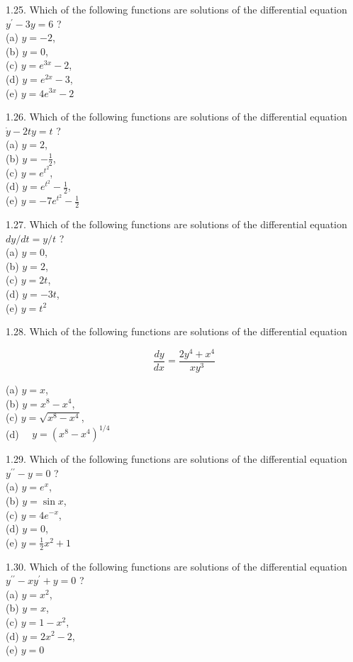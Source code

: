 \documentclass[10pt]{article}
\begin{document}
1.25. Which of the following functions are solutions of the differential equation $y^{\prime}-3 y=6$ ?\\
(a) $y=-2$,\\
(b) $y=0$,\\
(c) $y=e^{3 x}-2$,\\
(d) $y=e^{2 x}-3$,\\
(e) $y=4 e^{3 x}-2$

1.26. Which of the following functions are solutions of the differential equation $\dot{y}-2 t y=t$ ?\\
(a) $y=2$,\\
(b) $y=-\frac{1}{2}$,\\
(c) $y=e^{t^{2}}$,\\
(d) $y=e^{t^{2}}-\frac{1}{2}$,\\
(e) $y=-7 e^{t^{2}}-\frac{1}{2}$

1.27. Which of the following functions are solutions of the differential equation $d y / d t=y / t$ ?\\
(a) $y=0$,\\
(b) $y=2$,\\
(c) $y=2 t$,\\
(d) $y=-3 t$,\\
(e) $y=t^{2}$

1.28. Which of the following functions are solutions of the differential equation

$$
\frac{d y}{d x}=\frac{2 y^{4}+x^{4}}{x y^{3}}
$$

(a) $y=x$,\\
(b) $y=x^{8}-x^{4}$,\\
(c) $y=\sqrt{x^{8}-x^{4}}$,\\
(d) $\quad y=\left(x^{8}-x^{4}\right)^{1 / 4}$

1.29. Which of the following functions are solutions of the differential equation $y^{\prime \prime}-y=0$ ?\\
(a) $y=e^{x}$,\\
(b) $y=\sin x$,\\
(c) $y=4 e^{-x}$,\\
(d) $y=0$,\\
(e) $y=\frac{1}{2} x^{2}+1$

1.30. Which of the following functions are solutions of the differential equation $y^{\prime \prime}-x y^{\prime}+y=0$ ?\\
(a) $y=x^{2}$,\\
(b) $y=x$,\\
(c) $y=1-x^{2}$,\\
(d) $y=2 x^{2}-2$,\\
(e) $y=0$
\end{document}

